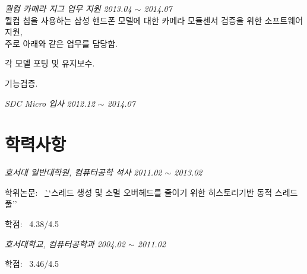 \documentclass[line,margin]{res}
\begin{document}
\begin{resume}
  {\sl 퀄컴 카메라 지그 업무 지원} \hfill {\sl 2013.04 $\sim$ 2014.07} \vspace{1mm} \\
  {\small
    퀄컴 칩을 사용하는 삼성 핸드폰 모델에 대한 카메라 모듈센서 검증을 위한 소프트웨어 지원, \\
    주로 아래와 같은 업무를 담당함.}
  \vspace{1mm}
  \begin{itemize}
    {\small
    \item[-] 각 모델 포팅 및 유지보수. \vspace{-1mm}
    \item[-] 기능검증.}
  \end{itemize}

  {\sl SDC Micro 입사} \hfill {\sl 2012.12 $\sim$ 2014.07} \vspace{0mm}


  \section{학력사항}

  {\sl 호서대 일반대학원, 컴퓨터공학 석사} \hfill {\sl 2011.02 $\sim$ 2013.02} \vspace{1mm}
  \begin{itemize}
    {\small
    \item[-] 학위논문: ~\href{http://dlibrary.hoseo.ac.kr/search/DetailView.ax?sid=4&cid=950591}
      ``스레드 생성 및 소멸 오버헤드를 줄이기 위한 히스토리기반 동적 스레드 풀'' \vspace{-1mm}
    \item[-] 학점: ~4.38/4.5}
  \end{itemize}

  {\sl 호서대학교, 컴퓨터공학과} \hfill {\sl 2004.02 $\sim$ 2011.02} \vspace{1mm}
  \begin{itemize}
    {\small
    \item[-] 학점: ~3.46/4.5}
  \end{itemize}


\end{resume}

\end{document}
